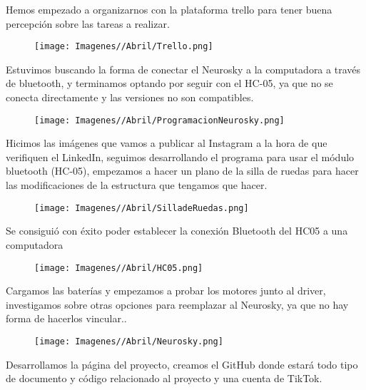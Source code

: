 \documentclass{article}
\begin{document}
Hemos empezado a organizarnos con la plataforma trello para tener buena percepción sobre las tareas a realizar.

\begin{figure}[H]
    \centering
    \texttt{[image: Imagenes//Abril/Trello.png]}
\end{figure}

Estuvimos buscando la forma de conectar el Neurosky a la computadora a través de bluetooth, y terminamos optando por seguir con el HC-05, ya que no se conecta directamente y las versiones no son compatibles.



\begin{figure}[H]
    \centering
    \texttt{[image: Imagenes//Abril/ProgramacionNeurosky.png]}
\end{figure}

\newpage

Hicimos las imágenes que vamos a publicar al Instagram a la hora de que verifiquen el LinkedIn, seguimos desarrollando el programa para usar el módulo bluetooth (HC-05), empezamos a hacer un plano de la silla de ruedas para hacer las modificaciones de la estructura que tengamos que hacer.

\begin{figure}[H]
    \centering
    \texttt{[image: Imagenes//Abril/SilladeRuedas.png]}
\end{figure}

Se consiguió con éxito poder establecer la conexión Bluetooth del HC05 a una computadora 

\begin{figure}[H]
    \centering
    \texttt{[image: Imagenes//Abril/HC05.png]}
\end{figure}

\newpage

Cargamos las baterías y empezamos a probar los motores junto al driver, investigamos sobre otras opciones para reemplazar al Neurosky, ya que no hay forma de hacerlos vincular..

\begin{figure}[H]
    \centering
    \texttt{[image: Imagenes//Abril/Neurosky.png]}
\end{figure}

Desarrollamos la página del proyecto, creamos el GitHub donde estará todo tipo de documento y código relacionado al proyecto y una cuenta de TikTok.
\end{document}
